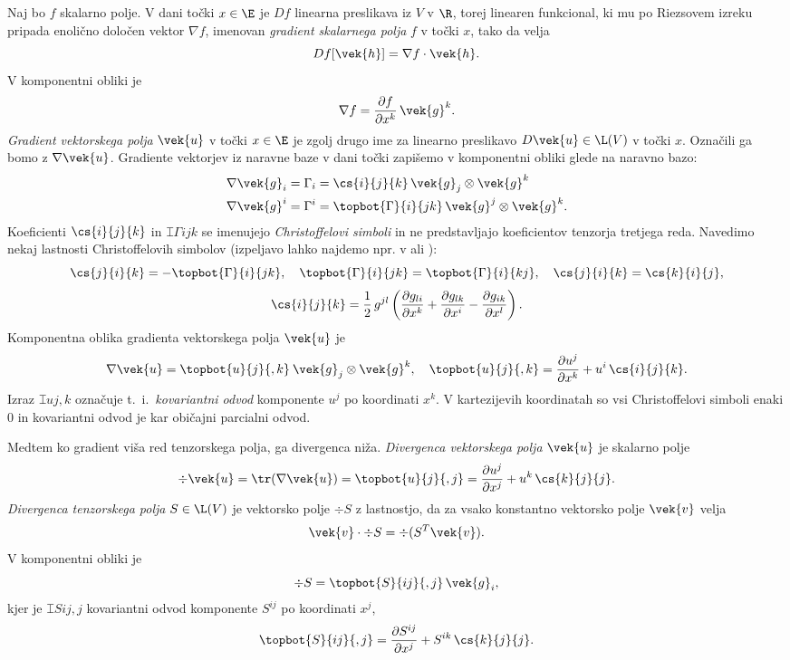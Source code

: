 Naj bo $f$ skalarno polje. V dani točki $x\in\E$ je $Df$ linearna preslikava iz $V$ v $\R$, torej linearen
funkcional, ki mu po Riezsovem izreku pripada enolično določen vektor $\nabla f$, imenovan
\emph{gradient skalarnega polja} $f$ v točki $x$, tako da velja
\[
	Df[\vek{h}]=\nabla f \cdot \vek{h}.
\]
V komponentni obliki je
\[
	\nabla f = \frac{\partial f}{\partial x^k}\,\vek{g}^k.
\]
\emph{Gradient vektorskega polja} $\vek{u}$ v točki $x\in\E$ je zgolj drugo ime za linearno preslikavo
$D\vek{u}\in\L(V)$ v točki $x$. Označili ga bomo z $\nabla\vek{u}$. Gradiente vektorjev iz naravne baze
v dani točki zapišemo v komponentni obliki glede na naravno bazo:
\begin{align*}
	\nabla \vek{g}_i&=\Gamma_i=\cs{i}{j}{k}\,\vek{g}_j\otimes\vek{g}^k\\
	\nabla \vek{g}^i&=\Gamma^i=\topbot{\Gamma}{i}{jk}\,\vek{g}^j\otimes\vek{g}^k.
\end{align*}
Koeficienti $\cs{i}{j}{k}$ in $\topbot{\Gamma}{i}{jk}$ se imenujejo \emph{Christoffelovi simboli} in
ne predstavljajo koeficientov tenzorja tretjega reda. Navedimo nekaj lastnosti Christoffelovih
simbolov (izpeljavo lahko najdemo npr. v \cite[str. 275--277]{liu} ali \cite[str. 59]{haupt}):
\begin{equation*}
	\cs{j}{i}{k}=-\topbot{\Gamma}{i}{jk},\quad \topbot{\Gamma}{i}{jk}=\topbot{\Gamma}{i}{kj},\quad
	\cs{j}{i}{k}=\cs{k}{i}{j},
\end{equation*}
\begin{equation*}
	\cs{i}{j}{k}=\frac{1}{2}\,g^{jl}\left(\frac{\partial g_{li}}{\partial x^k}+
	\frac{\partial g_{lk}}{\partial x^i}-\frac{\partial g_{ik}}{\partial x^l}\right).
\end{equation*}
Komponentna oblika gradienta vektorskega polja $\vek{u}$ je
\begin{equation*}
	\nabla\vek{u}= \topbot{u}{j}{,k}\:\vek{g}_j\otimes\vek{g}^k,\quad
	\topbot{u}{j}{,k}=\frac{\partial u^j}{\partial x^k}+u^i\,\cs{i}{j}{k}.
\end{equation*}
Izraz $\topbot{u}{j}{,k}$ označuje t.~i.~\emph{kovariantni odvod} komponente $u^j$
po koordinati $x^k$. V kartezijevih koordinatah so vsi Christoffelovi simboli enaki 0 in
kovariantni odvod je kar običajni parcialni odvod.

Medtem ko gradient viša red tenzorskega polja, ga divergenca niža.
\emph{Divergenca vektorskega polja} $\vek{u}$ je skalarno polje
\begin{equation*}
	\div\vek{u}=\tr(\nabla\vek{u})=\topbot{u}{j}{,j}=\frac{\partial u^j}{\partial x^j}+u^k\,\cs{k}{j}{j}.
\end{equation*}
\emph{Divergenca tenzorskega polja} $S\in\L(V)$ je vektorsko polje $\div S$ z lastnostjo,
da za vsako konstantno vektorsko polje $\vek{v}$ velja
\[ \vek{v}\cdot\div S = \div(S^T\vek{v}). \]
V komponentni obliki je
\[ \div S = \topbot{S}{ij}{,j}\,\vek{g}_i, \]
kjer je $\topbot{S}{ij}{,j}$ kovariantni odvod komponente $S^{ij}$ po koordinati $x^j$,
\[ \topbot{S}{ij}{,j} = \frac{\partial S^{ij}}{\partial x^j}+S^{ik}\,\cs{k}{j}{j}. \]

